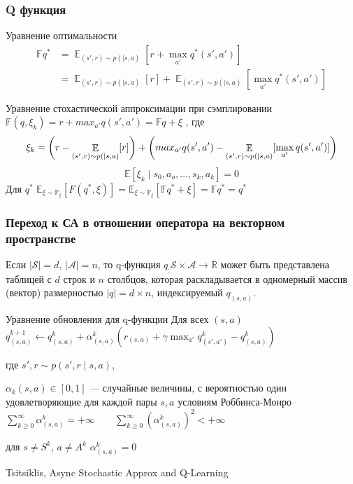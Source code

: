\documentclass[notheorems]{beamer} %
\begin{document}
\begin{frame}
	\frametitle{Q функция }
	\begin{block}{Уравнение оптимальности}
		\begin{align*}
		 \mathbb{F}q^* &= \mathop{\mathbb{E}}_{(s',r) \sim p( \mid s,a)}[r + \max_{a'} q^*(s',a')] \\
		 &= \mathop{\mathbb{E}}_{(s',r) \sim p( \mid s,a)}[r] + \mathop{\mathbb{E}}_{(s',r) \sim p( \mid s,a)}[\max_{a'} q^*(s',a')]
		 \end{align*}
	\end{block}
	
	\begin{block}{Уравнение стохастической аппроксимации при сэмплировании}
		$
		\mathbb{F}(q, \xi_k) = r + max_{a'} q(s',a') 
		= \mathbb{F}q + \xi
		$
		, где
		$$ \xi_k = \bigg{(}r - \mathop{\mathbb{E}}_{(s',r) \sim p( \mid s,a)}[r]\bigg{)} + \bigg{(}max_{a'} q(s',a') - \mathop{\mathbb{E}}_{(s',r) \sim p( \mid s,a)}[\max_{a'} q(s',a')] \bigg{)}$$
		$$ \mathbb{E}[ \xi_k \mid s_0, a_o, \dots, s_k, a_k] = 0$$
		Для $q^*$  $\mathbb{E}_{\xi \sim \mathbb{P}_\xi}[ F(q^*, \xi) ] = \mathbb{E}_{\xi \sim \mathbb{P}_\xi}[ \mathbb{F}q^* + \xi ]  = \mathbb{F}q^* = q^* $
	\end{block} 
	
\end{frame}
\begin{frame}
	\frametitle{Переход к СА в отношении оператора на векторном пространстве}	
	
	Если $|\mathcal{S}|=d$, $|\mathcal{A}|=n$,  то q-функция $q_: \mathcal{S} \times  \mathcal{A}  \to \mathbb{R}$ может быть представлена таблицей с  $d$ строк и $n$ столбцов, которая раскладывается в одномерный массив (вектор) размерностью $|q| = d \times n$, индексируемый $q_{(s,a)}$.
	
	\begin{block}{Уравнение обновления для q-функции}
		Для всех $(s,a)$ 
		\alert{$q^{k+1}_{(s, a)} \leftarrow q^{k}_{(s, a)} + \alpha^k_{(s, a)} \left( r_{(s,a)} + \gamma \max_{a'} q^k_{(s', a') }- q^k_{(s, a)}\right )$}
		
		где $s',r \sim p(s',r \mid s, a)$, 
		
		$\alpha_k(s, a) \in [0, 1]$ --- случайные величины, с вероятностью один удовлетворяющие для каждой пары $s, a$ условиям Роббинса-Монро
		$\sum_{k \ge 0}^{\infty} \alpha^k_{(s, a)} = +\infty \qquad \sum_{k \ge 0}^{\infty} (\alpha^k_{(s, a)})^2 < +\infty$
		
		для $s \neq S^k$, $a \neq A^k$  $\alpha^k_{(s, a)}=0$
	\end{block}
Tsitsiklis, Async Stochastic Approx and Q-Learning
	
\end{frame}
\end{document}
